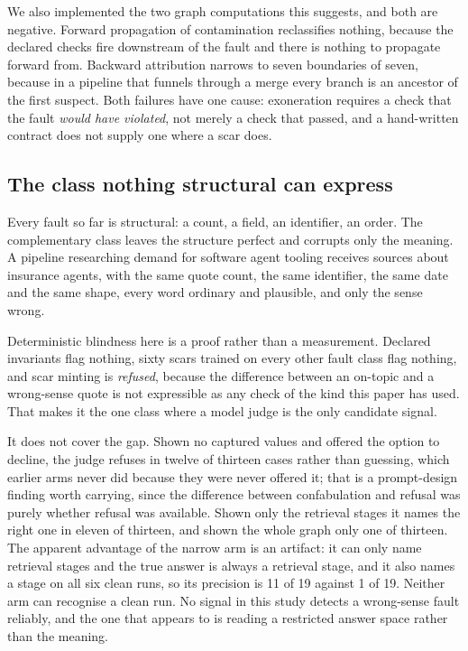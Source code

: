 We also implemented the two graph computations this suggests, and both are negative.
Forward propagation of contamination reclassifies nothing, because the declared checks
fire downstream of the fault and there is nothing to propagate forward from. Backward
attribution narrows to seven boundaries of seven, because in a pipeline that funnels
through a merge every branch is an ancestor of the first suspect. Both failures have one
cause: exoneration requires a check that the fault \emph{would have violated}, not merely
a check that passed, and a hand-written contract does not supply one where a scar does.

\subsection{The class nothing structural can express}
\label{sec:wrongsense}

Every fault so far is structural: a count, a field, an identifier, an order. The
complementary class leaves the structure perfect and corrupts only the meaning. A pipeline
researching demand for software agent tooling receives sources about insurance agents, with
the same quote count, the same identifier, the same date and the same shape, every word
ordinary and plausible, and only the sense wrong.

Deterministic blindness here is a proof rather than a measurement. Declared invariants flag
nothing, sixty scars trained on every other fault class flag nothing, and scar minting is
\emph{refused}, because the difference between an on-topic and a wrong-sense quote is not
expressible as any check of the kind this paper has used. That makes it the one class where
a model judge is the only candidate signal.

It does not cover the gap. Shown no captured values and offered the option to decline, the
judge refuses in twelve of thirteen cases rather than guessing, which earlier arms never did
because they were never offered it; that is a prompt-design finding worth carrying, since
the difference between confabulation and refusal was purely whether refusal was available.
Shown only the retrieval stages it names the right one in eleven of thirteen, and shown the
whole graph only one of thirteen. The apparent advantage of the narrow arm is an artifact:
it can only name retrieval stages and the true answer is always a retrieval stage, and it
also names a stage on all six clean runs, so its precision is 11 of 19 against 1 of 19.
Neither arm can recognise a clean run. No signal in this study detects a wrong-sense fault
reliably, and the one that appears to is reading a restricted answer space rather than the
meaning.